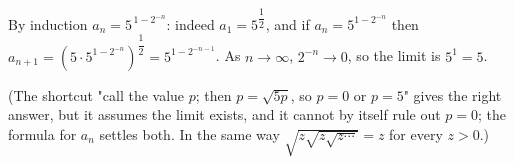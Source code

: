 By induction $a_n=5^{\,1-2^{-n}}$: indeed $a_1=5^{\dfrac{1}{2}}$, and if $a_n=5^{1-2^{-n}}$ then $a_{n+1}=\left(5\cdot5^{1-2^{-n}}\right)^{\dfrac{1}{2}}=5^{1-2^{-n-1}}$. As $n\to\infty$, $2^{-n}\to0$, so the limit is $5^1=\boxed{5}$.

(The shortcut "call the value $p$; then $p=\sqrt{5p}$, so $p=0$ or $p=5$" gives the right answer, but it assumes the limit exists, and it cannot by itself rule out $p=0$; the formula for $a_n$ settles both. In the same way $\sqrt{z\sqrt{z\sqrt{z\cdots}}}=z$ for every $z>0$.)
